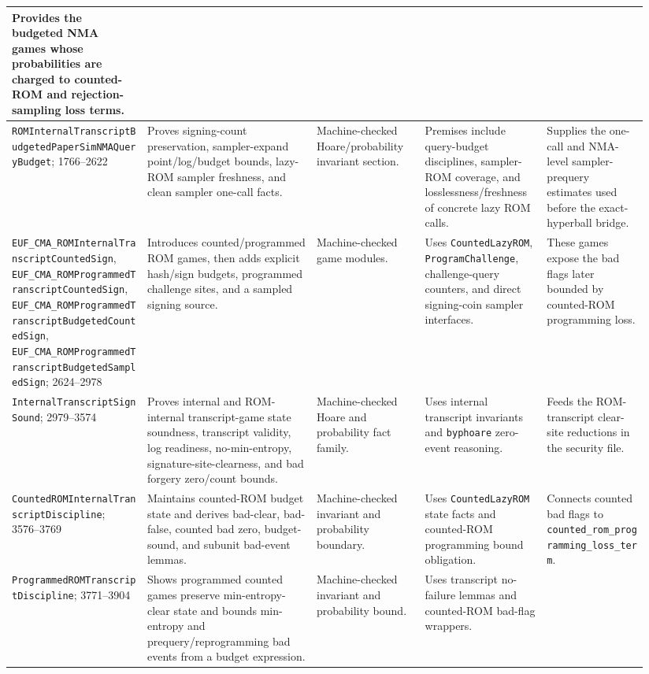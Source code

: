 \documentclass[11pt]{report}
\DeclareRobustCommand{\ec}[1]{\ifmmode\text{\nolinkurl{#1}}\else\nolinkurl{#1}\fi}
\theoremstyle{definition}
\theoremstyle{plain}
\begin{document}
{\begin{longtable}{p{0.20\linewidth}p{0.25\linewidth}p{0.16\linewidth}p{0.18\linewidth}p{0.15\linewidth}}
Provides the budgeted NMA games whose probabilities are charged to counted-ROM
and rejection-sampling loss terms. \\
\midrule
\ec{ROMInternalTranscriptBudgetedPaperSimNMAQueryBudget}; 1766--2622 &
Proves signing-count preservation, sampler-expand point/log/budget bounds,
lazy-ROM sampler freshness, and clean sampler one-call facts. &
Machine-checked Hoare/probability invariant section. &
Premises include query-budget disciplines, sampler-ROM coverage, and
losslessness/freshness of concrete lazy ROM calls. &
Supplies the one-call and NMA-level sampler-prequery estimates used before the
exact-hyperball bridge. \\
\midrule
\ec{EUF\_CMA\_ROMInternalTranscriptCountedSign},
\ec{EUF\_CMA\_ROMProgrammedTranscriptCountedSign},
\ec{EUF\_CMA\_ROMProgrammedTranscriptBudgetedCountedSign},
\ec{EUF\_CMA\_ROMProgrammedTranscriptBudgetedSampledSign}; 2624--2978 &
Introduces counted/programmed ROM games, then adds explicit hash/sign budgets,
programmed challenge sites, and a sampled signing source. &
Machine-checked game modules. &
Uses \ec{CountedLazyROM}, \ec{ProgramChallenge}, challenge-query counters, and
direct signing-coin sampler interfaces. &
These games expose the bad flags later bounded by counted-ROM programming
loss. \\
\midrule
\ec{InternalTranscriptSignSound}; 2979--3574 &
Proves internal and ROM-internal transcript-game state soundness, transcript
validity, log readiness, no-min-entropy, signature-site-clearness, and bad
forgery zero/count bounds. &
Machine-checked Hoare and probability fact family. &
Uses internal transcript invariants and \ec{byphoare} zero-event reasoning. &
Feeds the ROM-transcript clear-site reductions in the security file. \\
\midrule
\ec{CountedROMInternalTranscriptDiscipline}; 3576--3769 &
Maintains counted-ROM budget state and derives bad-clear, bad-false, counted
bad zero, budget-sound, and subunit bad-event lemmas. &
Machine-checked invariant and probability boundary. &
Uses \ec{CountedLazyROM} state facts and counted-ROM programming bound
obligation. &
Connects counted bad flags to \ec{counted\_rom\_programming\_loss\_term}. \\
\midrule
\ec{ProgrammedROMTranscriptDiscipline}; 3771--3904 &
Shows programmed counted games preserve min-entropy-clear state and bounds
min-entropy and prequery/reprogramming bad events from a budget expression. &
Machine-checked invariant and probability bound. &
Uses transcript no-failure lemmas and counted-ROM bad-flag wrappers. &

\end{longtable}}
\end{document}
